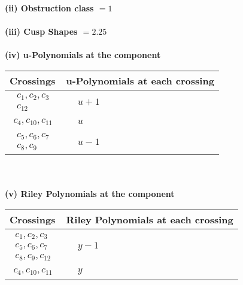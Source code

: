 \documentclass[1p]{elsarticle_modified}
\theoremstyle{definition}
\begin{document}
\flushleft \textbf{(ii) Obstruction class $= 1$}\\~\\
\flushleft \textbf{(iii) Cusp Shapes $= 2.25$}\\~\\
\newpage\renewcommand{\arraystretch}{1}
\flushleft \textbf{(iv) u-Polynomials at the component}\newline \\
\begin{tabular}{m{50pt}|m{274pt}}
Crossings & \hspace{64pt}u-Polynomials at each crossing \\
\hline $$\begin{aligned}c_{1},c_{2},c_{3}\\c_{12}\end{aligned}$$&$\begin{aligned}
&u+1
\end{aligned}$\\
\hline $$\begin{aligned}c_{4},c_{10},c_{11}\end{aligned}$$&$\begin{aligned}
&u
\end{aligned}$\\
\hline $$\begin{aligned}c_{5},c_{6},c_{7}\\c_{8},c_{9}\end{aligned}$$&$\begin{aligned}
&u-1
\end{aligned}$\\
\hline
\end{tabular}\\~\\
\newpage\renewcommand{\arraystretch}{1}
\flushleft \textbf{(v) Riley Polynomials at the component}\newline \\
\begin{tabular}{m{50pt}|m{274pt}}
Crossings & \hspace{64pt}Riley Polynomials at each crossing \\
\hline $$\begin{aligned}c_{1},c_{2},c_{3}\\c_{5},c_{6},c_{7}\\c_{8},c_{9},c_{12}\end{aligned}$$&$\begin{aligned}
&y-1
\end{aligned}$\\
\hline $$\begin{aligned}c_{4},c_{10},c_{11}\end{aligned}$$&$\begin{aligned}
&y
\end{aligned}$\\
\hline
\end{tabular}\\~\\
\end{document}
